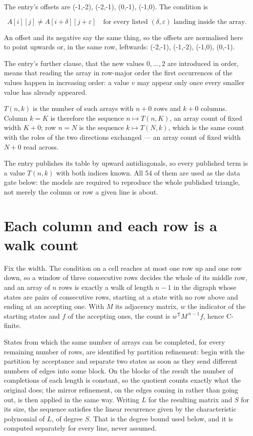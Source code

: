 \documentclass[11pt]{article}
\theoremstyle{definition}
\begin{document}
The entry's offsets are (-1,-2), (-2,-1), (0,-1), (-1,0). The condition is

\[A[i][j] \ne A[i{+}\delta][j{+}\varepsilon]\quad\text{for every listed }(\delta,\varepsilon)\text{ landing inside the array.}\]

An offset and its negative say the same thing, so the offsets are normalised here to point upwards or, in the same row, leftwards: (-2,-1), (-1,-2), (-1,0), (0,-1).

The entry's further clause, that the new values $0,\dots,2$ are introduced in order, means that reading the array in row-major order the first occurrences of the values happen in increasing order: a value $v$ may appear only once every smaller value has already appeared.

$T(n,k)$ is the number of such arrays with $n + 0$ rows and $k + 0$ columns. Column $k = K$ is therefore the sequence $n \mapsto T(n,K)$, an array count of fixed width $K + 0$; row $n = N$ is the sequence $k \mapsto T(N,k)$, which is the same count with the roles of the two directions exchanged --- an array count of fixed width $N + 0$ read across.

The entry publishes its table by upward antidiagonals, so every published term is a value $T(n,k)$ with both indices known. All 54 of them are used as the data gate below: the models are required to reproduce the whole published triangle, not merely the column or row a given line is about.

\section{Each column and each row is a walk count}

Fix the width. The condition on a cell reaches at most one row up and one row down, so a window of three consecutive rows decides the whole of its middle row, and an array of $n$ rows is exactly a walk of length $n-1$ in the digraph whose states are pairs of consecutive rows, starting at a state with no row above and ending at an accepting one. With $M$ its adjacency matrix, $w$ the indicator of the starting states and $f$ of the accepting ones, the count is $w^{\mathsf T}M^{\,n-1}f$, hence C-finite.

States from which the same number of arrays can be completed, for every remaining number of rows, are identified by partition refinement: begin with the partition by acceptance and separate two states as soon as they send different numbers of edges into some block. On the blocks of the result the number of completions of each length is constant, so the quotient counts exactly what the original does; the mirror refinement, on the edges coming in rather than going out, is then applied in the same way. Writing $L$ for the resulting matrix and $S$ for its size, the sequence satisfies the linear recurrence given by the characteristic polynomial of $L$, of degree $S$. That is the degree bound used below, and it is computed separately for every line, never assumed.
\end{document}
